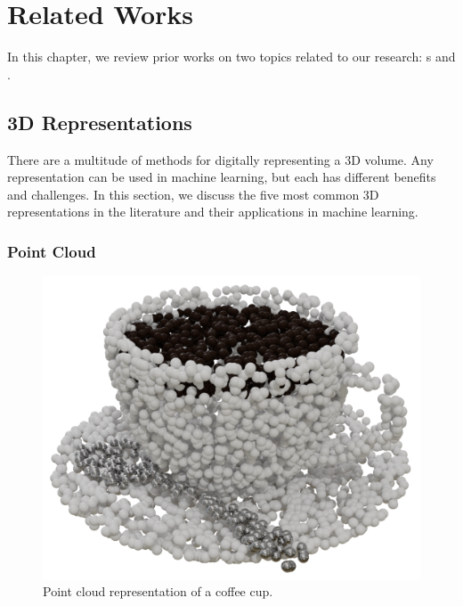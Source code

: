 
\chapter{Related Works}
\label{chap:related_works}

In this chapter, we review prior works on two topics related to our research: s and .

\section{3D Representations}
\label{sec:3d_representations}

There are a multitude of methods for digitally representing a 3D volume. Any representation can be used in machine learning, but each has different benefits and challenges. In this section, we discuss the five most common 3D representations in the literature and their applications in machine learning.


\subsection{Point Cloud}
\label{subsec:point_cloud}

\begin{figure}[h]
	\centering
	\includegraphics[scale=0.2]{Images/Point Cloud Cup}
	\caption{Point cloud representation of a coffee cup.}
	\label{fig:point_cloud_cup}
\end{figure}

